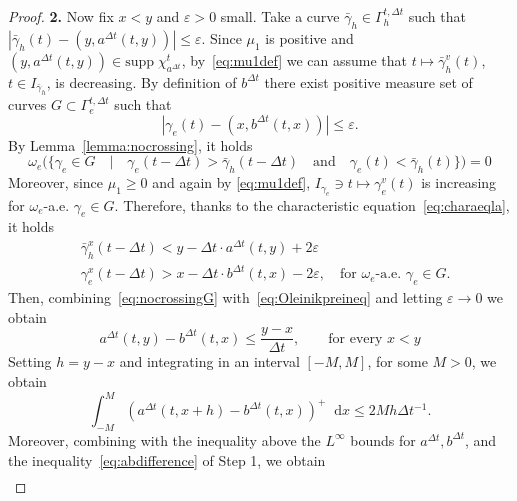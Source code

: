 \documentclass[10pt,a4paper]{amsart}
\newcommand*\dif{\mathop{}\!\mathrm{d}}
\newcommand{\mr}[1]{\mathrm{#1}}
\begin{document}
\begin{proof}
\vspace{0.5cm}
\textbf{2.}
Now fix $x < y$ and $\varepsilon> 0$ small. Take a curve $\bar \gamma_h \in \Gamma_h^{t, \Delta t}$ such that $|\bar \gamma_h(t) -(y, a^{\Delta t}(t,y))| \leq \varepsilon$. Since $\mu_1$ is positive and $(y, a^{\Delta t}(t,y)) \in \mr{supp} \; \chi_{a^{\Delta t}}^t$, by~\eqref{eq:mu1def} we can assume that $t \mapsto \bar \gamma_h^v(t)$, $t \in I_{\bar \gamma_h}$, is decreasing.
By definition of $b^{\Delta t}$ there exist positive measure set of curves $G \subset \Gamma_e^{t, \Delta t}$ such that  $$|\gamma_e(t)-(x, b^{\Delta t}(t,x))| \leq \varepsilon.$$
By Lemma~\ref{lemma:nocrossing}, it holds
\begin{equation}\label{eq:nocrossingG}
\omega_e\Big( \Big\{ \gamma_e \in G \quad \big| \quad \gamma_e(t-\Delta t) >\bar \gamma_h(t-\Delta t) \quad \text{and} \quad \gamma_e(t) < \bar \gamma_h(t)\Big\}\Big) = 0
\end{equation}
Moreover, since $\mu_1 \geq 0$ and again by \eqref{eq:mu1def}, $I_{\gamma_e} \ni t \mapsto \gamma^v_e(t)$ is increasing for $\omega_e$-a.e. $\gamma_e \in G$. Therefore, thanks to the characteristic equation~\eqref{eq:charaeqla}, it holds
\begin{equation}\label{eq:Oleinikpreineq}
\begin{aligned}
    &\bar \gamma_h^x(t-\Delta t) < y -\Delta t\cdot a^{\Delta t}(t, y) + 2\varepsilon\\
    & \gamma_e^x(t-\Delta t) > x -\Delta t\cdot b^{\Delta t}(t, x) - 2\varepsilon, \quad \text{for $\omega_e$-a.e. $\gamma_e \in G$}.
    \end{aligned}
\end{equation}
Then, combining~\eqref{eq:nocrossingG} with~\eqref{eq:Oleinikpreineq} and letting $\varepsilon \to 0$ we obtain
\begin{equation}
    a^{\Delta t}(t, y) -b^{\Delta t}(t, x) \leq \frac{y-x}{\Delta t} , \qquad \text{for every $x < y$}
\end{equation}
Setting $h = y-x$ and integrating in an interval $[-M, M]$, for some $M > 0$, we obtain
\begin{equation}
    \int_{-M}^M (a^{\Delta t}(t, x+h)-b^{\Delta t}(t, x) )^+ \dif x \leq 2 M h \Delta t^{-1}.
\end{equation}
Moreover, combining with the inequality above the $L^{\infty}$ bounds for $a^{\Delta t}, b^{\Delta t}$,  and the inequality~\eqref{eq:abdifference} of Step 1, we obtain
\begin{equation}
    \begin{aligned}

\end{aligned}
\end{equation}
\end{proof}
\end{document}
